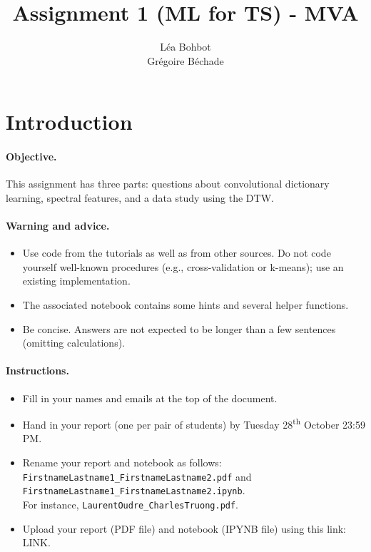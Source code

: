 \documentclass[11pt]{article}
\title{Assignment 1 (ML for TS) - MVA}
\author{
Léa Bohbot \email{lea.bohbot@polytechnique.edu} \\ %
Grégoire Béchade \email{gregoire.bechade@gmail.com} %
}
\begin{document}
\maketitle

\section{Introduction}

\paragraph{Objective.} This assignment has three parts: questions about convolutional dictionary learning, spectral features, and a data study using the DTW. 

\paragraph{Warning and advice.} 
\begin{itemize}
    \item Use code from the tutorials as well as from other sources. Do not code yourself well-known procedures (e.g., cross-validation or k-means); use an existing implementation. 
    \item The associated notebook contains some hints and several helper functions.
    \item Be concise. Answers are not expected to be longer than a few sentences (omitting calculations).
\end{itemize}



\paragraph{Instructions.}
\begin{itemize}
    \item Fill in your names and emails at the top of the document.
    \item Hand in your report (one per pair of students) by Tuesday 28\textsuperscript{th} October 23:59 PM.
    \item Rename your report and notebook as follows:\\ \texttt{FirstnameLastname1\_FirstnameLastname2.pdf} and\\ \texttt{FirstnameLastname1\_FirstnameLastname2.ipynb}.\\
    For instance, \texttt{LaurentOudre\_CharlesTruong.pdf}.
    \item Upload your report (PDF file) and notebook (IPYNB file) using this link: \footnotesize{LINK}.
\end{itemize}
\end{document}
